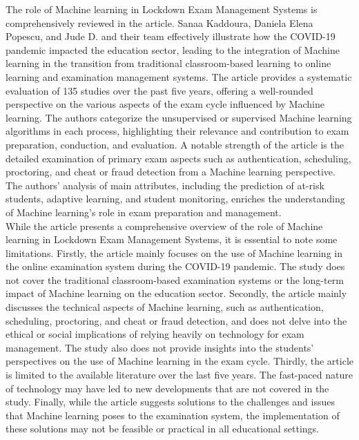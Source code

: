 The role of Machine learning in Lockdown Exam Management Systems is comprehensively reviewed in the article. Sanaa Kaddoura, Daniela Elena Popescu, and Jude D. and their team effectively illustrate how the COVID-19 pandemic impacted the education sector, leading to the integration of Machine learning in the transition from traditional classroom-based learning to online learning and examination management systems. The article provides a systematic evaluation of 135 studies over the past five years, offering a well-rounded perspective on the various aspects of the exam cycle influenced by Machine learning. The authors categorize the unsupervised or supervised Machine learning algorithms in each process, highlighting their relevance and contribution to exam preparation, conduction, and evaluation. A notable strength of the article is the detailed examination of primary exam aspects such as authentication, scheduling, proctoring, and cheat or fraud detection from a Machine learning perspective. The authors' analysis of main attributes, including the prediction of at-risk students, adaptive learning, and student monitoring, enriches the understanding of Machine learning's role in exam preparation and management.\\
While the article presents a comprehensive overview of the role of Machine learning in Lockdown Exam Management Systems, it is essential to note some limitations. Firstly, the article mainly focuses on the use of Machine learning in the online examination system during the COVID-19 pandemic. The study does not cover the traditional classroom-based examination systems or the long-term impact of Machine learning on the education sector. Secondly, the article mainly discusses the technical aspects of Machine learning, such as authentication, scheduling, proctoring, and cheat or fraud detection, and does not delve into the ethical or social implications of relying heavily on technology for exam management. The study also does not provide insights into the students' perspectives on the use of Machine learning in the exam cycle. Thirdly, the article is limited to the available literature over the last five years. The fast-paced nature of technology may have led to new developments that are not covered in the study. Finally, while the article suggests solutions to the challenges and issues that Machine learning poses to the examination system, the implementation of these solutions may not be feasible or practical in all educational settings.\cite{kaddoura2022systematic}\\

